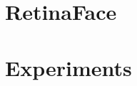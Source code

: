 \documentclass[12pt]{article}
\begin{document}
\section{RetinaFace}
\label{sec:retina}


\section{Experiments}
\label{sec:exper}

\newpage
\printbibliography
\end{document}

